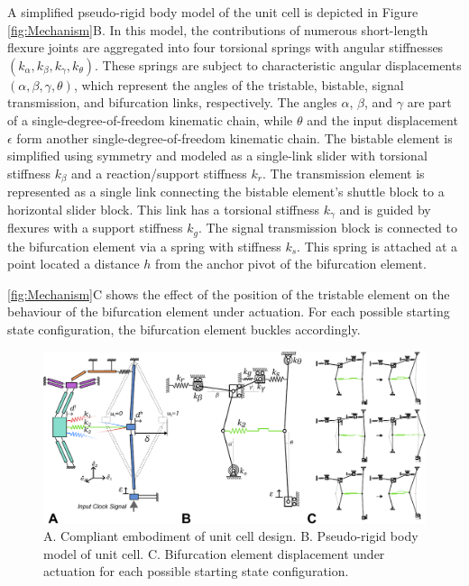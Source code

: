 A simplified pseudo-rigid body model of the unit cell is depicted in Figure \autoref*{fig:Mechanism}B. In this model, the contributions of numerous short-length flexure joints are aggregated into four torsional springs with angular stiffnesses \((k_\alpha, k_\beta, k_\gamma, k_\theta)\). These springs are subject to characteristic angular displacements \((\alpha, \beta, \gamma, \theta)\), which represent the angles of the tristable, bistable, signal transmission, and bifurcation links, respectively. The angles \(\alpha\), \(\beta\), and \(\gamma\) are part of a single-degree-of-freedom kinematic chain, while \(\theta\) and the input displacement \(\epsilon\) form another single-degree-of-freedom kinematic chain.
The bistable element is simplified using symmetry and modeled as a single-link slider with torsional stiffness \( k_\beta \) and a reaction/support stiffness \( k_r \). The transmission element is represented as a single link connecting the bistable element's shuttle block to a horizontal slider block. This link has a torsional stiffness \( k_\gamma \) and is guided by flexures with a support stiffness \( k_g \).
The signal transmission block is connected to the bifurcation element via a spring with stiffness \( k_s \). This spring is attached at a point located a distance \( h \) from the anchor pivot of the bifurcation element.

\autoref*{fig:Mechanism}C shows the effect of the position of the tristable element on the behaviour of the bifurcation element under actuation. For each possible starting state configuration, the bifurcation element buckles accordingly. 


\begin{figure}[H]
    \centering
    \includegraphics[width=\textwidth]{images/SVGs/PRBM.pdf}
    \caption{A. Compliant embodiment of unit cell design. B. Pseudo-rigid body model of unit cell. C. Bifurcation element displacement under actuation for each possible starting state configuration.}
    \label{fig:Mechanism}
\end{figure}




